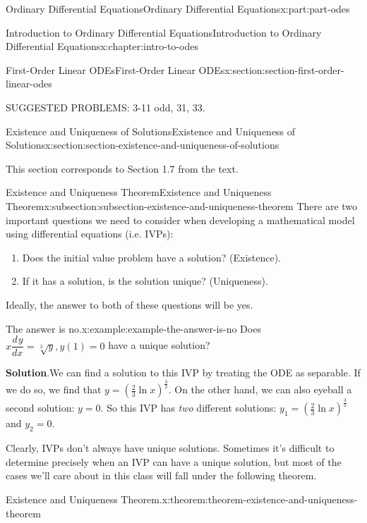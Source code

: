 \documentclass[oneside,10pt,]{book}
\newcommand{\blocktitlefont}{\relax}
\numberwithin{equation}{part}
\newcommand{\dv}[3][]{\dfrac{d^{#1} #2}{d #3^{#1}}}
\begin{document}
\begin{partptx}{Ordinary Differential Equations}{}{Ordinary Differential Equations}{}{}{x:part:part-odes}
\begin{chapterptx}{Introduction to Ordinary Differential Equations}{}{Introduction to Ordinary Differential Equations}{}{}{x:chapter:intro-to-odes}
\begin{sectionptx}{First-Order Linear ODEs}{}{First-Order Linear ODEs}{}{}{x:section:section-first-order-linear-odes}
\begin{conclusion}{}
SUGGESTED PROBLEMS: 3-11 odd, 31, 33.%
\end{conclusion}%
\end{sectionptx}
%
%
\typeout{************************************************}
\typeout{************************************************}
%
\begin{sectionptx}{Existence and Uniqueness of Solutions}{}{Existence and Uniqueness of Solutions}{}{}{x:section:section-existence-and-uniqueness-of-solutions}
\begin{introduction}{}%
This section corresponds to Section 1.7 from the text.%
\end{introduction}%
%
%
\typeout{************************************************}
\typeout{************************************************}
%
\begin{subsectionptx}{Existence and Uniqueness Theorem}{}{Existence and Uniqueness Theorem}{}{}{x:subsection:subsection-existence-and-uniqueness-theorem}
There are two important questions we need to consider when developing a mathematical model using differential equations (i.e. IVPs):%
\begin{enumerate}
\item{}Does the initial value problem have a solution? (Existence).%
\item{}If it has a solution, is the solution unique? (Uniqueness).%
\end{enumerate}
Ideally, the answer to both of these questions will be yes.%
\begin{example}{The answer is no.}{x:example:example-the-answer-is-no}%
Does \(x\dv{y}{x} = \sqrt[3]{y},y(1) = 0\) have a unique solution?%
\par\smallskip%
\noindent\textbf{\blocktitlefont Solution}.\hypertarget{g:solution:idp105548780300576}{}\quad{}We can find a solution to this IVP by treating the ODE as separable. If we do so, we find that \(y = \left(\frac{2}{3}\ln x\right)^{\frac{3}{2}}\). On the other hand, we can also eyeball a second solution: \(y=0\). So this IVP has \emph{two} different solutions: \(y_{1} = \left(\frac{2}{3}\ln x\right)^{\frac{3}{2}}\) and \(y_{2} = 0\).%
\end{example}
Clearly, IVPs don't always have unique solutions. Sometimes it's difficult to determine precisely when an IVP can have a unique solution, but most of the cases we'll care about in this class will fall under the following theorem.%
\begin{theorem}{Existence and Uniqueness Theorem.}{}{x:theorem:theorem-existence-and-uniqueness-theorem}%

\end{theorem}
\end{subsectionptx}
\end{sectionptx}
\end{chapterptx}
\end{partptx}
\end{document}
